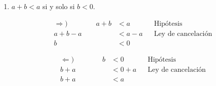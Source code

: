 \begin{enumerate}[label=\alph*)]
\begin{enumerate}[label=\roman*)]
  \item $a+b<a$ si y solo si $b<0$.
  \begin{center}\vspace{-1em}
  \begin{minipage}[l]{.5\linewidth}
   \begin{align*} \Rightarrow) \qquad \qquad
    a+b &< a && \text{Hipótesis}\\
    a+b-a &< a-a && \text{Ley de cancelación}\\
    b &< 0%
   \end{align*}
  \end{minipage}%
  \begin{minipage}[r]{.5\linewidth}
   \begin{align*} \Leftarrow) \qquad \qquad
    b &< 0 && \text{Hipótesis}\\
    b + a &< 0 + a && \text{Ley de cancelación}\\
    b+ a &< a%
   \end{align*}
  \end{minipage}
  \end{center}
  

\end{enumerate}
\end{enumerate}
